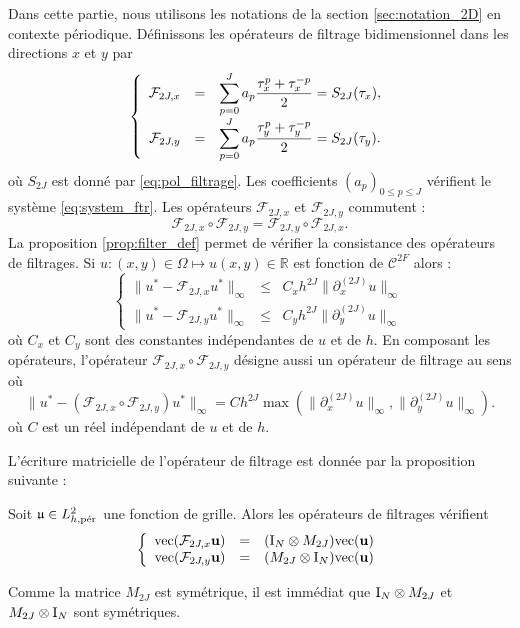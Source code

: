 Dans cette partie, nous utilisons les notations de la section \ref{sec:notation_2D} en contexte périodique. Définissons les opérateurs de filtrage bidimensionnel dans les directions $x$ et $y$ par
\begin{equation}
\left\lbrace
\begin{array}{rcl}
\mathcal{F}_{2J,x} & = & \gsum_{p=0}^J a_p \dfrac{\tau_x^p + \tau_x^{-p}}{2}  = S_{2J}(\tau_x), \\
\mathcal{F}_{2J,y} & = & \gsum_{p=0}^J a_p \dfrac{\tau_y^p + \tau_y^{-p}}{2} = S_{2J}(\tau_y).
\end{array}
\right.
\end{equation}
où $S_{2J}$ est donné par \eqref{eq:pol_filtrage}. 
Les coefficients $(a_p)_{0 \leq p \leq J}$ vérifient le système \eqref{eq:system_ftr}. Les opérateurs $\mathcal{F}_{2J,x}$ et $\mathcal{F}_{2J,y}$ commutent :
\begin{equation}
\mathcal{F}_{2J,x} \circ \mathcal{F}_{2J,y} = \mathcal{F}_{2J,y} \circ \mathcal{F}_{2J,x}.
\end{equation}
La proposition \ref{prop:filter_def} permet de vérifier la consistance des opérateurs de filtrages.
Si $u : (x,y) \in \Omega \mapsto u(x,y) \in \mathbb{R}$ est fonction de $\mathcal{C}^{2F}$ alors :
\begin{equation}
\left\lbrace
\begin{array}{rcl}
\| u^* - \mathcal{F}_{2J,x}u^* \|_{\infty} & \leq & C_x h^{2J} \| \partial_x^{(2J)}u \|_{\infty}\\
\| u^* - \mathcal{F}_{2J,y}u^* \|_{\infty} & \leq & C_y h^{2J} \| \partial_y^{(2J)}u \|_{\infty}
\end{array}
\right.
\end{equation}
où $C_x$ et $C_y$ sont des constantes indépendantes de $u$ et de $h$.
En composant les opérateurs, l'opérateur $\mathcal{F}_{2J,x} \circ \mathcal{F}_{2J,y}$ désigne aussi un opérateur de filtrage au sens où
\begin{equation}
\| u^* - (\mathcal{F}_{2J,x} \circ \mathcal{F}_{2J,y}) u^* \|_{\infty} = C h^{2J} \max (\| \partial_x^{(2J)}u \|_{\infty}, \| \partial_y^{(2J)}u \|_{\infty}).
\end{equation}
où $C$ est un réel indépendant de $u$ et de $h$.

L'écriture matricielle de l'opérateur de filtrage est donnée par la proposition suivante :
\begin{proposition}
Soit $\mathfrak{u} \in L^2_{h,\per}$ une fonction de grille. Alors les opérateurs de filtrages vérifient
\begin{equation}
\left\lbrace
\begin{array}{rcl}
\text{vec} (\mathcal{F}_{2J,x} \mathbf{u}) & = & (\I_N \otimes M_{2J}) \text{vec} (\mathbf{u})\\
\text{vec} (\mathcal{F}_{2J,y} \mathbf{u}) & = & (M_{2J} \otimes \I_N) \text{vec} (\mathbf{u})\\
\end{array}
\right.
\end{equation}
\end{proposition}
Comme la matrice $M_{2J}$ est symétrique, il est immédiat que $\I_N \otimes M_{2J}$ et $M_{2J} \otimes \I_N$ sont symétriques.
